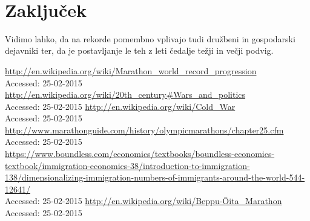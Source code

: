\documentclass[11pt,a4paper]{article}
\begin{document}
\begin{center}
\\
\end{center}

\section{Zaključek}
Vidimo lahko, da na rekorde pomembno vplivajo tudi družbeni in gospodarski dejavniki ter, da je postavljanje le teh z leti čedalje težji in večji podvig.

\newpage
\begin{thebibliography}{6}
  \url{http://en.wikipedia.org/wiki/Marathon_world_record_progression}\\
  {Accessed: 25-02-2015}
  \url{http://en.wikipedia.org/wiki/20th_century#Wars_and_politics}\\
  {Accessed: 25-02-2015}
  \url{http://en.wikipedia.org/wiki/Cold_War}\\
  {Accessed: 25-02-2015}
  \url{http://www.marathonguide.com/history/olympicmarathons/chapter25.cfm}\\
  {Accessed: 25-02-2015}
  \url{ https://www.boundless.com/economics/textbooks/boundless-economics-textbook/immigration-economics-38/introduction-to-immigration-138/dimensionalizing-immigration-numbers-of-immigrants-around-the-world-544-12641/}\\
  {Accessed: 25-02-2015}
  \url{ http://en.wikipedia.org/wiki/Beppu-Ōita_Marathon}\\
  {Accessed: 25-02-2015}
 
 

\end{thebibliography}
\end{document}
